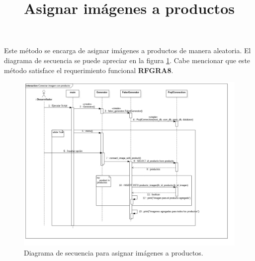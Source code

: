 \title{\textbf{Asignar imágenes a productos \\}}
Este método se encarga de asignar imágenes a productos de manera aleatoria. El diagrama de secuencia se puede apreciar en la figura \ref{image:DSAsignarImagenesAProductos}. Cabe mencionar que este método satisface el requerimiento funcional \textbf{RFGRA8}.
\FloatBarrier
\begin{figure}[htbp!]
		\centering
			\includegraphics[width=1.1 \textwidth]{imagenes/DSRuben/connect_image_with_product_generator}
		\caption{Diagrama de secuencia para asignar imágenes a productos.}
		\label{image:DSAsignarImagenesAProductos}
\end{figure}
\FloatBarrier




